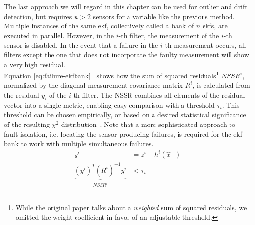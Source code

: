 The last approach we will regard in this chapter can be used for outlier and drift detection, but requires $n>2$ sensors for a variable like the previous method. Multiple instances of the same \gls{ekf}, collectively called a bank of $n$ \gls{ekf}s, are executed in parallel. However, in the $i$-th filter, the measurement of the $i$-th sensor is disabled. In the event that a failure in the $i$-th measurement occurs, all filters except the one that does not incorporate the faulty measurement will show a very high residual. \\ Equation \ref{eq:failure-ekfbank}~\cite[p.~3]{Kobayashi.2003} shows how the sum of squared residuals\footnote{While the original paper talks about a \textit{weighted} sum of squared residuals, we omitted the weight coefficient in favor of an adjustable threshold.} $\textit{NSSR}^i$, normalized by the diagonal measurement covariance matrix $R^i$, is calculated from the residual $y_i$ of the $i$-th filter. The NSSR combines all elements of the residual vector into a single metric, enabling easy comparison with a threshold $\tau_i$. This threshold can be chosen empirically, or based on a desired statistical significance of the resulting $\chi^2$ distribution~\cite[p.~3]{Xue.2007}. Note that a more sophisticated approach to fault isolation, i.e. locating the sensor producing failures, is required for the \gls{ekf} bank to work with multiple simultaneous failures.
\begin{subequations}\label{eq:failure-ekfbank}
\begin{alignat}{2}%
y^i &= z^i - h^i(\hat{x}^-) \\%
\underbrace{(y^i)^T (R^i)^{-1} y^i}_\textrm{$\textit{NSSR}^i$} &< \tau_i%
\end{alignat}
\end{subequations}
